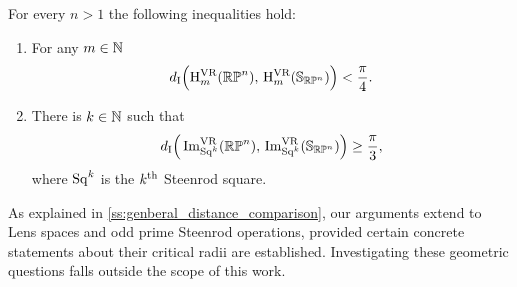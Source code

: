 \begin{introtheorem}\label{thm:inequalities intro}
    For every \(n > 1\) the following inequalities hold:
    \begin{enumerate}
    	\item For any \(m \in \mathbb{N}\)
    	\[
    	d_{\mathrm{I}}\Big(\mathrm{H}^{\mathrm{VR}}_m(\mathbb{RP}^n),\, \mathrm{H}^{\mathrm{VR}}_m(\mathbb{S}_{\mathbb{RP}^n})\Big) < \frac{\pi}{4}.
    	\]
    
    	\item There is \(k \in \mathbb{N}\) such that
    	\[
    	d_{\mathrm{I}}\Big(\operatorname{Im}_{\mathrm{Sq}^k}^{\mathrm{VR}}(\mathbb{RP}^n),\, \operatorname{Im}_{\mathrm{Sq}^k}^{\mathrm{VR}}(\mathbb{S}_{\mathbb{RP}^n})\Big) \geq \frac{\pi}{3},
    	\]
    	where \(\mathrm{Sq}^k\) is the \(k^{\mathrm{th}}\) Steenrod square.
    \end{enumerate}
\end{introtheorem}

\medskip As explained in \cref{ss:genberal_distance_comparison}, our arguments extend to Lens spaces and odd prime Steenrod operations, provided certain concrete statements about their critical radii are established.
Investigating these geometric questions falls outside the scope of this work.
